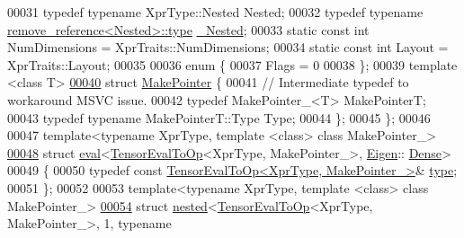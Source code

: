 \begin{DoxyCode}
00031   \textcolor{keyword}{typedef} \textcolor{keyword}{typename} XprType::Nested Nested;
00032   \textcolor{keyword}{typedef} \textcolor{keyword}{typename} \hyperlink{group___sparse_core___module}{remove\_reference<Nested>::type} 
      \hyperlink{group___sparse_core___module}{\_Nested};
00033   \textcolor{keyword}{static} \textcolor{keyword}{const} \textcolor{keywordtype}{int} NumDimensions = XprTraits::NumDimensions;
00034   \textcolor{keyword}{static} \textcolor{keyword}{const} \textcolor{keywordtype}{int} Layout = XprTraits::Layout;
00035 
00036   \textcolor{keyword}{enum} \{
00037     Flags = 0
00038   \};
00039   \textcolor{keyword}{template} <\textcolor{keyword}{class} T>
\hyperlink{struct_eigen_1_1internal_1_1traits_3_01_tensor_eval_to_op_3_01_xpr_type_00_01_make_pointer___01_4_01_4_1_1_make_pointer}{00040}   \textcolor{keyword}{struct }\hyperlink{struct_eigen_1_1_make_pointer}{MakePointer} \{
00041     \textcolor{comment}{// Intermediate typedef to workaround MSVC issue.}
00042     \textcolor{keyword}{typedef} MakePointer\_<T> MakePointerT;
00043     \textcolor{keyword}{typedef} \textcolor{keyword}{typename} MakePointerT::Type Type;
00044   \};
00045 \};
00046 
00047 \textcolor{keyword}{template}<\textcolor{keyword}{typename} XprType, \textcolor{keyword}{template} <\textcolor{keyword}{class}> \textcolor{keyword}{class }MakePointer\_>
\hyperlink{struct_eigen_1_1internal_1_1eval_3_01_tensor_eval_to_op_3_01_xpr_type_00_01_make_pointer___01_4_00_01_eigen_1_1_dense_01_4}{00048} \textcolor{keyword}{struct }\hyperlink{struct_eigen_1_1internal_1_1eval}{eval}<\hyperlink{class_eigen_1_1_tensor_eval_to_op}{TensorEvalToOp}<XprType, MakePointer\_>, \hyperlink{namespace_eigen}{Eigen}::
      \hyperlink{struct_eigen_1_1_dense}{Dense}>
00049 \{
00050   \textcolor{keyword}{typedef} \textcolor{keyword}{const} \hyperlink{class_eigen_1_1_tensor_eval_to_op}{TensorEvalToOp<XprType, MakePointer\_>}& 
      \hyperlink{class_eigen_1_1_tensor_eval_to_op}{type};
00051 \};
00052 
00053 \textcolor{keyword}{template}<\textcolor{keyword}{typename} XprType, \textcolor{keyword}{template} <\textcolor{keyword}{class}> \textcolor{keyword}{class }MakePointer\_>
\hyperlink{struct_eigen_1_1internal_1_1nested_3_01_tensor_eval_to_op_3_01_xpr_type_00_01_make_pointer___01_98b103532d565d0e57efbce4aca129cf}{00054} \textcolor{keyword}{struct }\hyperlink{struct_eigen_1_1internal_1_1nested}{nested}<\hyperlink{class_eigen_1_1_tensor_eval_to_op}{TensorEvalToOp}<XprType, MakePointer\_>, 1, typename 

\end{DoxyCode}
